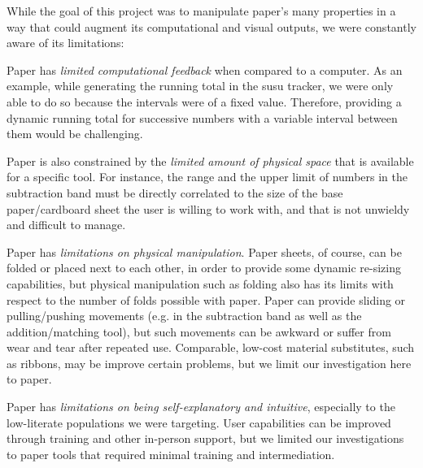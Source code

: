 \documentclass{sig-alternate}
\begin{document}
While the goal of this project was to manipulate paper's many properties in a way that could augment its computational and visual outputs, we were constantly aware of its limitations:
\begin{compactitem}
  \item Paper has \emph{limited computational feedback} when compared to a computer. As an example, while generating the running total in the susu tracker, we were only able to do so because the intervals were of a fixed value. Therefore, providing a dynamic running total for successive numbers with a variable interval between them would be challenging. 
  \item Paper is also constrained by the \emph{limited amount of physical space} that is available for a specific tool. For instance, the range and the upper limit of numbers in the subtraction band must be directly correlated to the size of the base paper/cardboard sheet the user is willing to work with, and that is not unwieldy and difficult to manage.
  \item Paper has \emph{limitations on physical manipulation}. Paper sheets, of course, can be folded or placed next to each other, in order to provide some dynamic re-sizing capabilities, but physical manipulation such as folding also has its limits with respect to the number of folds possible with paper. Paper can provide sliding or pulling/pushing movements (e.g. in the subtraction band as well as the addition/matching tool), but such movements can be awkward or suffer from wear and tear after repeated use. Comparable, low-cost material substitutes, such as ribbons, may be improve certain problems, but we limit our investigation here to paper.
  \item Paper has \emph{limitations on being self-explanatory and intuitive}, especially to the low-literate populations we were targeting. User capabilities can be improved through training and other in-person support, but we limited our investigations to paper tools that required minimal training and intermediation.
\end{compactitem}


\end{document}
